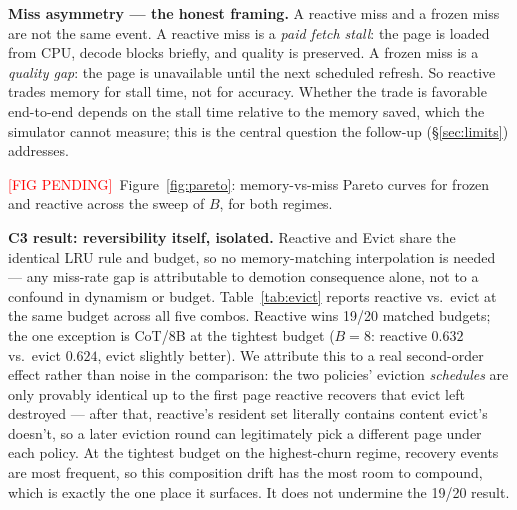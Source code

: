 \documentclass[11pt]{article}
\newcommand{\NEEDFIG}{\textcolor{red}{[FIG PENDING]}}
\begin{document}
\textbf{Miss asymmetry --- the honest framing.} A reactive miss and a
frozen miss are not the same event. A reactive miss is a \emph{paid
fetch stall}: the page is loaded from CPU, decode blocks briefly, and
quality is preserved. A frozen miss is a \emph{quality gap}: the page
is unavailable until the next scheduled refresh. So reactive trades
memory for stall time, not for accuracy. Whether the trade is
favorable end-to-end depends on the stall time relative to the memory
saved, which the simulator cannot measure; this is the central
question the follow-up (\S\ref{sec:limits}) addresses.

\NEEDFIG~Figure~\ref{fig:pareto}: memory-vs-miss Pareto curves for
frozen and reactive across the sweep of $B$, for both regimes.

\textbf{C3 result: reversibility itself, isolated.} Reactive and Evict
share the identical LRU rule and budget, so no memory-matching
interpolation is needed --- any miss-rate gap is attributable to
demotion consequence alone, not to a confound in dynamism or budget.
Table~\ref{tab:evict} reports reactive vs.\ evict at the same budget
across all five combos. Reactive wins 19/20 matched budgets; the one
exception is CoT/8B at the tightest budget ($B{=}8$: reactive $0.632$
vs.\ evict $0.624$, evict slightly better). We attribute this to a
real second-order effect rather than noise in the comparison: the two
policies' eviction \emph{schedules} are only provably identical up to
the first page reactive recovers that evict left destroyed --- after
that, reactive's resident set literally contains content evict's
doesn't, so a later eviction round can legitimately pick a different
page under each policy. At the tightest budget on the highest-churn
regime, recovery events are most frequent, so this composition drift
has the most room to compound, which is exactly the one place it
surfaces. It does not undermine the 19/20 result.
\end{document}
